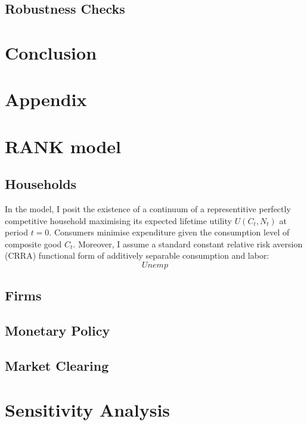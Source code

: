 \documentclass[11pt, a4paper, leqno]{article}
\begin{document}
\subsection{Robustness Checks}


\section{Conclusion} \label{conclusion}

\clearpage

\printbibliography
{}

\clearpage

\section*{\Huge Appendix}
\appendix
\setcounter{equation}{0}
\section{RANK model}
\subsection{Households}
In the model, I posit the existence of a continuum of a representitive perfectly competitive household maximising its expected lifetime utility $U \left( C_{t},N_{t} \right)$ at period $t = 0$. Consumers minimise expenditure given the consumption level of composite good $C_{t}$. Moreover, I assume a standard constant relative risk aversion (CRRA) functional form of additively separable consumption and labor:
\begin{equation}
    Unemp
\end{equation}

\subsection{Firms}

\subsection{Monetary Policy}

\subsection{Market Clearing}

\section{Sensitivity Analysis}
\end{document}
